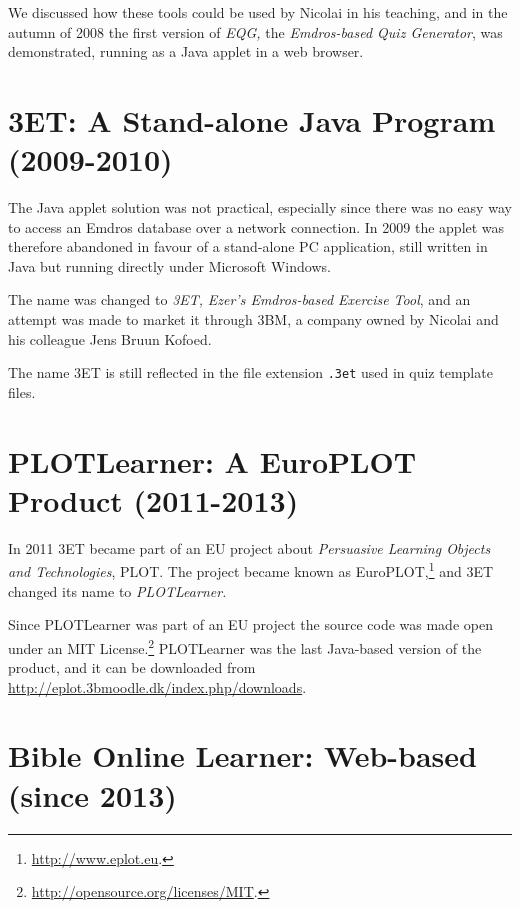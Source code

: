 \documentclass[11pt,oneside,a4paper]{memoir}
\begin{document}
We discussed how these tools could be used by Nicolai in his teaching, and in the autumn of 2008 the
first version of \emph{EQG,} the \emph{Emdros-based Quiz Generator}, was demonstrated, running as a Java
applet in a web browser.

\section{3ET: A Stand-alone Java Program (2009-2010)}

The Java applet solution was not practical, especially since there was no easy way to access an
Emdros database over a network connection. In 2009 the applet was therefore abandoned in favour of a
stand-alone PC application, still written in Java but running directly under Microsoft Windows.

The name was changed to \emph{3ET,} \emph{Ezer's Emdros-based Exercise Tool}, and an attempt was made to
market it through 3BM, a company owned by Nicolai and his colleague Jens Bruun Kofoed.

The name 3ET is still reflected in the file extension \texttt{.3et} used in quiz template files.

\section{PLOTLearner: A EuroPLOT Product (2011-2013)}

In 2011 3ET became part of an EU project about \emph{Persuasive Learning Objects and Technologies},
PLOT. The project became known as
EuroPLOT,\footnote{\url{http://www.eplot.eu}.} and 3ET changed its name to
\emph{PLOTLearner.}

Since PLOTLearner was part of an EU project the source code was made open under an MIT
License.\footnote{\url{http://opensource.org/licenses/MIT}.} PLOTLearner was the last Java-based
version of the product, and it can be downloaded from
\url{http://eplot.3bmoodle.dk/index.php/downloads}.

\section{Bible Online Learner: Web-based (since 2013)}
\end{document}
